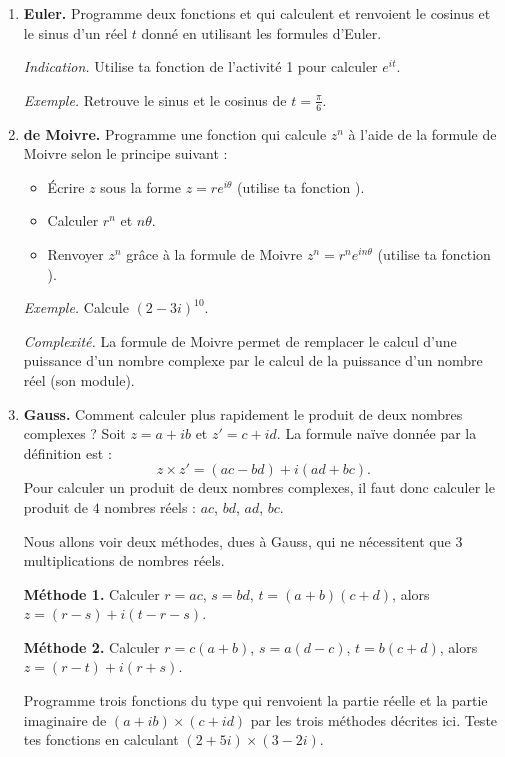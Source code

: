 \documentclass[11pt,class=report,crop=false]{standalone}
\begin{document}
\begin{activite}


\begin{enumerate}
  \item \textbf{Euler.} Programme deux fonctions  et  qui calculent et renvoient le cosinus et le sinus d'un réel $t$ donné en utilisant les formules d'Euler.
  
 \emph{Indication.} Utilise ta fonction  de l'activité 1 pour calculer $e^{it}$. 
  
  \emph{Exemple.} Retrouve le sinus et le cosinus de $t = \frac\pi6$.
  
     
  
  \item \textbf{de Moivre.} Programme une fonction  qui calcule $z^n$ à l'aide de la formule de Moivre selon le principe suivant :
  \begin{itemize}
    \item \'Ecrire $z$ sous la forme $z = r e^{i\theta}$ (utilise ta fonction ).
    \item Calculer $r^n$ et $n\theta$.
    \item Renvoyer $z^n$ grâce à la formule de Moivre $z^n = r^n e^{in\theta}$
     (utilise ta fonction ).
  \end{itemize}
  \emph{Exemple.} Calcule $(2-3i)^{10}$. 
  
  \emph{Complexité.} La formule de Moivre permet de remplacer le calcul d'une puissance d'un nombre complexe par le calcul de la puissance d'un nombre réel (son module).
  
  \item \textbf{Gauss.} Comment calculer plus rapidement le produit de deux nombres complexes ?
  Soit $z=a+ib$ et $z'=c+id$. La formule naïve donnée par la définition est :
  $$z \times z' = (ac-bd) + i(ad+bc).$$
  Pour calculer un produit de deux nombres complexes, il faut donc calculer le produit de $4$ nombres réels : $ac$, $bd$, $ad$, $bc$.
  
  Nous allons voir deux méthodes, dues à Gauss, qui ne nécessitent que $3$ multiplications de nombres réels.
  
  \textbf{Méthode 1.}
  Calculer $r=ac$, $s = bd$, $t = (a+b)(c+d)$, alors $z = (r-s) + i(t-r-s)$.
  
  \textbf{Méthode 2.}
  Calculer $r = c(a+b)$, $s = a(d-c)$, $t = b(c+d)$, alors  $z = (r-t) + i(r+s)$.

  Programme trois fonctions du type  qui renvoient la partie réelle et la partie imaginaire de $(a+ib)\times(c+id)$ par les trois méthodes décrites ici.
 Teste tes fonctions en calculant $(2+5i)\times(3-2i)$.  
  
\end{enumerate} 
\end{activite}
\end{document}
